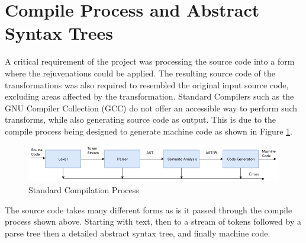 \documentclass[bsc,frontabs,singlespacing,parskip,deptreport]{infthesis}
\begin{document}
\section{Compile Process and Abstract Syntax Trees}
A critical requirement of the project was processing the source code into a form where the rejuvenations could be applied. The resulting source code of the transformations was also required to resembled the original input source code, excluding areas affected by the transformation. Standard Compilers such as the GNU Compiler Collection (GCC) \cite{GCC} do not offer an accessible way to perform such transforms, while also generating source code as output. This is due to the compile process being designed to generate machine code as shown in Figure \ref{fig:comp_proc}.

\begin{figure}[!h]
    \centering
    \includegraphics[width=\textwidth]{images/Compilation-process.png}
    \caption{Standard Compilation Process}
    \label{fig:comp_proc}
\end{figure}
The source code takes many different forms as is it passed through the compile process shown above. Starting with text, then to a stream of tokens followed by a parse tree then a detailed abstract syntax tree, and finally machine code. 
\end{document}
